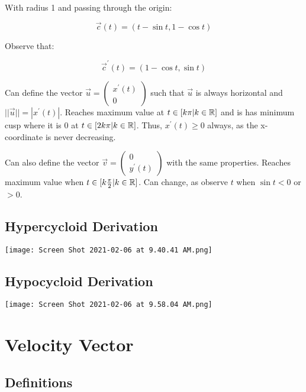 With radius 1 and passing through the origin:

\[\vec{c}(t)=(t-\sin t, 1 - \cos t)\]

Observe that:

\[\vec{c}^\prime(t)=(1-\cos t, \sin t)\]

Can define the vector $\vec{u}=\left(\begin{array}{c}x^{\prime}(t) \\0\end{array}\right)$
such that $\vec{u}$ is always horizontal and $||\vec{u}||=|x^\prime(t)|$. Reaches maximum
value at $t\in[k\pi|k\in\mathbb{R}]$ and is has minimum cusp where it is 0 at $t\in [2k\pi|k\in\mathbb{R}]$.
Thus, $x^\prime(t)\geq 0$ always, as the x-coordinate is never decreasing. \newline

\noindent
Can also define the vector $\vec{v}=\left(\begin{array}{c}0 \\y^{\prime}(t)\end{array}\right)$
with the same properties. Reaches maximum value when $t\in[k\frac{\pi}{2}|k\in\mathbb{R}]$.
Can change, as observe $t$ when $\sin t < 0$ or $ >0 $.

\subsection{Hypercycloid Derivation}

\begin{center}
    \texttt{[image: Screen Shot 2021-02-06 at 9.40.41 AM.png]}
\end{center}

\subsection{Hypocycloid Derivation}

\begin{center}
    \texttt{[image: Screen Shot 2021-02-06 at 9.58.04 AM.png]}
\end{center}

\section{Velocity Vector}

\subsection{Definitions}

